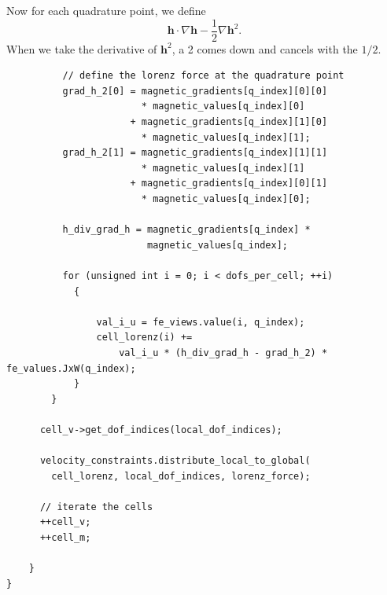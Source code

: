 \documentclass{article}
\begin{document}
            Now for each quadrature point, we define
            \[ 
            \boldsymbol{h}\cdot \nabla \boldsymbol{h} - \frac{1}{2}\nabla \boldsymbol{h}^2.
            \] 
            When we take the derivative of $\boldsymbol{h}^2$, a 2 comes down and cancels with the $1/2$. 
            \begin{lstlisting}
          // define the lorenz force at the quadrature point
          grad_h_2[0] = magnetic_gradients[q_index][0][0]
                        * magnetic_values[q_index][0]
                      + magnetic_gradients[q_index][1][0]
                        * magnetic_values[q_index][1];
          grad_h_2[1] = magnetic_gradients[q_index][1][1]
                        * magnetic_values[q_index][1]
                      + magnetic_gradients[q_index][0][1]
                        * magnetic_values[q_index][0];

          h_div_grad_h = magnetic_gradients[q_index] *
                         magnetic_values[q_index];

          for (unsigned int i = 0; i < dofs_per_cell; ++i)
            {

                val_i_u = fe_views.value(i, q_index);
                cell_lorenz(i) +=
                    val_i_u * (h_div_grad_h - grad_h_2) * fe_values.JxW(q_index);
            }
        }

      cell_v->get_dof_indices(local_dof_indices);

      velocity_constraints.distribute_local_to_global(
        cell_lorenz, local_dof_indices, lorenz_force);

      // iterate the cells
      ++cell_v;
      ++cell_m;

    }
}
            \end{lstlisting}
\end{document}
